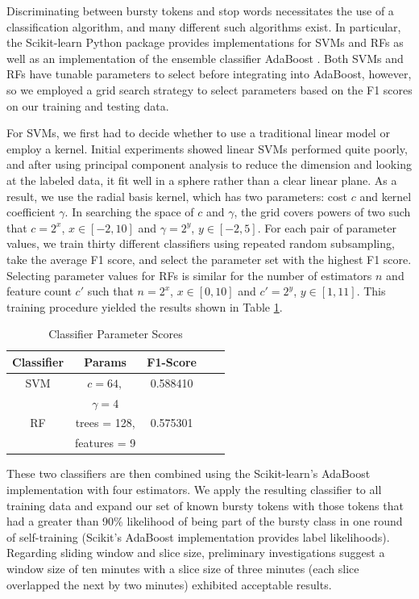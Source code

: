 \documentclass{sig-alternate}
\begin{document}
Discriminating between bursty tokens and stop words necessitates the use of a classification algorithm, and many different such algorithms exist.
In particular, the Scikit-learn Python package provides implementations for SVMs and RFs as well as an implementation of the ensemble classifier AdaBoost \cite{scikit-learn}.
Both SVMs and RFs have tunable parameters to select before integrating into AdaBoost, however, so we employed a grid search strategy to select parameters based on the F1 scores on our training and testing data.

For SVMs, we first had to decide whether to use a traditional linear model or employ a kernel.
Initial experiments showed linear SVMs performed quite poorly, and after using principal component analysis to reduce the dimension and looking at the labeled data, it fit well in a sphere rather than a clear linear plane. 
As a result, we use the radial basis kernel, which has two parameters: cost $c$ and kernel coefficient $\gamma$.
In searching the space of $c$ and $\gamma$, the grid covers powers of two such that $c = 2^x$, $x \in [-2, 10]$ and $\gamma = 2^y$, $y \in [-2, 5]$.
For each pair of parameter values, we train thirty different classifiers using repeated random subsampling, take the average F1 score, and select the parameter set with the highest F1 score.
Selecting parameter values for RFs is similar for the number of estimators $n$ and feature count $c'$ such that $n = 2^x$, $x \in [0, 10]$ and $c' = 2^y$, $y \in [1, 11]$.
This training procedure yielded the results shown in Table \ref{tab:scores}.

\begin{table}[htdp]
\caption{Classifier Parameter Scores}
\begin{center}
\begin{tabular}{|c|c|c|c|c|}
\hline
\textbf{Classifier} & \textbf{Params} & \textbf{F1-Score} \\ \hline
SVM & $c=64,$ & 0.588410 \\ 
& $\gamma=4$ & \\ \hline
RF & trees = 128, & 0.575301 \\
& features = 9 &  \\ \hline
\end{tabular}
\end{center}
\label{tab:scores}
\end{table}

These two classifiers are then combined using the Scikit-learn's AdaBoost implementation with four estimators.
We apply the resulting classifier to all training data and expand our set of known bursty tokens with those tokens that had a greater than 90\% likelihood of being part of the bursty class in one round of self-training (Scikit's AdaBoost implementation provides label likelihoods).
Regarding sliding window and slice size, preliminary investigations suggest a window size of ten minutes with a slice size of three minutes (each slice overlapped the next by two minutes) exhibited acceptable results.
\end{document}
